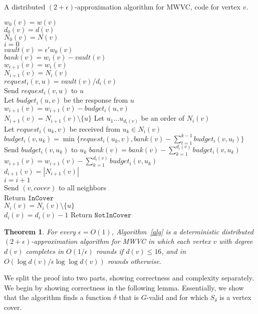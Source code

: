 \documentclass[11pt]{article}
\newtheorem{theorem}{Theorem}[section]
\newcommand{\Deal}{request}
\newcommand{\Vault}{vault}
\newcommand{\Bank}{bank}
\newcommand{\Budget}{budget}
\newcommand{\InCover}{\texttt{InCover}}
\newcommand{\NotInCover}{\texttt{NotInCover}}
\begin{document}
\LinesNumbered
\begin{algorithm}[htbp]
	\label{alg}
	\caption{A distributed $(2+\epsilon)$-approximation algorithm for MWVC, code for vertex $v$.}
	$w_0(v) = w(v)$\\
	$d_0(v) = d(v)$\\
	$N_0(v) = N(v)$\\
	$i=0$\\
	$\Vault(v) = \epsilon' w_0(v)$\\
	{
		$\Bank(v) = w_i(v) - \Vault(v)$\\
		$w_{i+1}(v) = w_i(v) $\\
		$N_{i+1}(v) = N_i(v)$\\
		{		
			$\Deal_i(v,u) = \Vault(v)/d_i(v)$\\
			Send $\Deal_i(v,u)$ to $u$\\
			Let $\Budget_i(u,v)$ be the response from $u$\\
			$w_{i+1}(v) = w_{i+1}(v) - \Budget_i(u,v)$\\
			\If{$\Budget_i(u,v) < \Deal_i(v,u)$}
			{
				$N_{i+1}(v) = N_{i+1}(v)\setminus\{u\}$
			}
		}
		Let $u_1\dots u_{d_i(v)}$ be an order of $N_i(v)$\\
		{
			Let $\Deal_i(u_k,v)$ be received from $u_k \in N_i(v)$\\
			$\Budget_i(v,u_k) = \min\{\Deal_i(u_k,v), \Bank(v)-\sum_{t=1}^{k-1}{\Budget_i(v,u_t)} \}$\\
			Send $\Budget_i(v,u_k)$ to $u_k$
		}
		$\Bank(v) = \Bank(v) - \sum_{k=1}^{d_i(v)}{\Budget_i(v,u_k)}$\\
		$w_{i+1}(v) = w_{i+1}(v) - \sum_{k=1}^{d_i(v)}{\Budget_i(v,u_k)}$\\
		$d_{i+1}(v) = |N_{i+1}(v)|$\\
		$i=i+1$\\
		{
            		Send $(v,cover)$ to all neighbors\\
            		Return $\InCover$\\
        		}
        		{
            		$N_i(v) = N_{i}(v)\setminus\{u\}$\\
            		$d_i(v) = d_i(v) - 1$
        		}
        		{
            		Return $\NotInCover$
        		}
    	}	
\end{algorithm}

\begin{theorem}
\label{thm:alg}
For every $\epsilon=O(1)$, Algorithm~\ref{alg} is a deterministic distributed $(2+\epsilon)$-approximation algorithm for MWVC in which each vertex $v$ with degree $d(v)$ completes in $O(1/\epsilon)$ rounds if $d(v)\leq 16$, and in $O(\log{d(v)}/\epsilon\log\log{d(v)})$ rounds otherwise.
\end{theorem}
We split the proof into two parts, showing correctness and complexity separately. We begin by showing correctness in the following lemma. Essentially, we show that the algorithm finds a function $\delta$ that is $G$-valid and for which $S_{\delta}$ is a vertex cover.
\end{document}
